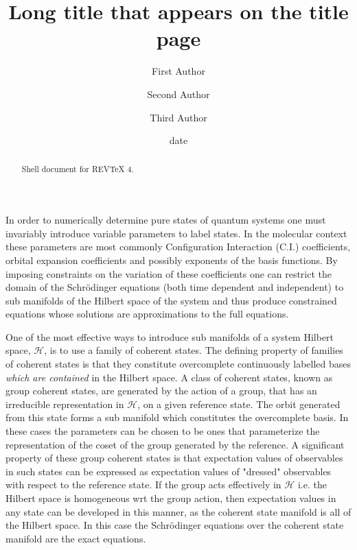 \documentclass[aps,preprint]{revtex4}%
\begin{document}
\title[Short title for running header]{Long title that appears on the title page}
\author{First Author}
\author{Second Author}
\author{Third Author}

\begin{abstract}
Shell document for REV\TeX{} 4.

\end{abstract}
\date[Date text]{date}




\maketitle
\tableofcontents


In order to numerically determine pure states of quantum systems one must
invariably introduce variable parameters to label states. In the molecular
context these parameters are most commonly Configuration Interaction (C.I.)
coefficients, orbital expansion coefficients and possibly exponents of the
basis functions. By imposing constraints on the variation of these
coefficients one can restrict the domain of the Schr\"{o}dinger equations
(both time dependent and independent) to sub manifolds of the Hilbert space of
the system and thus produce constrained equations whose solutions are
approximations to the full equations.

One of the most effective ways to introduce sub manifolds of a system Hilbert
space, $\mathcal{H}$, is to use a family of coherent states. The defining
property of families of coherent states is that they constitute overcomplete
continuously labelled bases \emph{which are contained} in the Hilbert space. A
class of coherent states, known as group coherent states, are generated by the
action of a group, that has an irreducible representation in $\mathcal{H}$, on
a given reference state. The orbit generated from this state forms a sub
manifold which constitutes the overcomplete basis. In these cases the
parameters can be chosen to be ones that parameterize the representation of
the coset of the group generated by the reference. A significant property of
these group coherent states is that expectation values of observables in such
states can be expressed as expectation values of "dressed" observables with
respect to the reference state. If the group acts effectively in $\mathcal{H}$
i.e. the Hilbert space is homogeneous wrt the group action, then expectation
values in any state can be developed in this manner, as the coherent state
manifold is all of the Hilbert space. In this case the Schr\"{o}dinger
equations over the coherent state manifold are the exact equations. 
\end{document}
